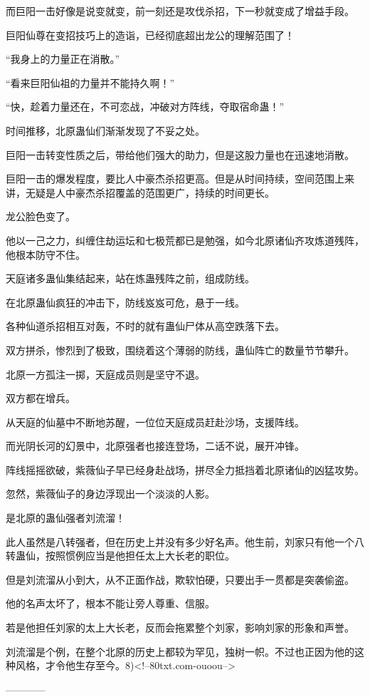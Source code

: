 \begin{this_body}
而巨阳一击好像是说变就变，前一刻还是攻伐杀招，下一秒就变成了增益手段。

巨阳仙尊在变招技巧上的造诣，已经彻底超出龙公的理解范围了！

“我身上的力量正在消散。”

“看来巨阳仙祖的力量并不能持久啊！”

“快，趁着力量还在，不可恋战，冲破对方阵线，夺取宿命蛊！”

时间推移，北原蛊仙们渐渐发现了不妥之处。

巨阳一击转变性质之后，带给他们强大的助力，但是这股力量也在迅速地消散。

巨阳一击的爆发程度，要比人中豪杰杀招更高。但是从时间持续，空间范围上来讲，无疑是人中豪杰杀招覆盖的范围更广，持续的时间更长。

龙公脸色变了。

他以一己之力，纠缠住劫运坛和七极荒都已是勉强，如今北原诸仙齐攻炼道残阵，他根本防守不住。

天庭诸多蛊仙集结起来，站在炼蛊残阵之前，组成防线。

在北原蛊仙疯狂的冲击下，防线岌岌可危，悬于一线。

各种仙道杀招相互对轰，不时的就有蛊仙尸体从高空跌落下去。

双方拼杀，惨烈到了极致，围绕着这个薄弱的防线，蛊仙阵亡的数量节节攀升。

北原一方孤注一掷，天庭成员则是坚守不退。

双方都在增兵。

从天庭的仙墓中不断地苏醒，一位位天庭成员赶赴沙场，支援阵线。

而光阴长河的幻景中，北原强者也接连登场，二话不说，展开冲锋。

阵线摇摇欲破，紫薇仙子早已经身赴战场，拼尽全力抵挡着北原诸仙的凶猛攻势。

忽然，紫薇仙子的身边浮现出一个淡淡的人影。

是北原的蛊仙强者刘流溜！

此人虽然是八转强者，但在历史上并没有多少好名声。他生前，刘家只有他一个八转蛊仙，按照惯例应当是他担任太上大长老的职位。

但是刘流溜从小到大，从不正面作战，欺软怕硬，只要出手一贯都是突袭偷盗。

他的名声太坏了，根本不能让旁人尊重、信服。

若是他担任刘家的太上大长老，反而会拖累整个刘家，影响刘家的形象和声誉。

刘流溜是个例，在整个北原的历史上都较为罕见，独树一帜。不过也正因为他的这种风格，才令他生存至今。8)<!--80txt.com-ouoou-->

------------

\end{this_body}

